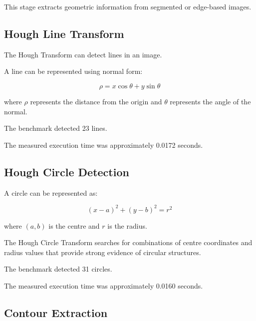\documentclass[11pt,a4paper]{article}
\begin{document}
This stage extracts geometric information from segmented or edge-based images.


\subsection{Hough Line Transform}

The Hough Transform can detect lines in an image.

A line can be represented using normal form:

\begin{equation}
\rho=x\cos\theta+y\sin\theta
\end{equation}

where $\rho$ represents the distance from the origin and $\theta$ represents the angle of the normal.

The benchmark detected 23 lines.

The measured execution time was approximately 0.0172 seconds.


\subsection{Hough Circle Detection}

A circle can be represented as:

\begin{equation}
(x-a)^2+(y-b)^2=r^2
\end{equation}

where $(a,b)$ is the centre and $r$ is the radius.

The Hough Circle Transform searches for combinations of centre coordinates and radius values that provide strong evidence of circular structures.

The benchmark detected 31 circles.

The measured execution time was approximately 0.0160 seconds.


\subsection{Contour Extraction}
\end{document}
